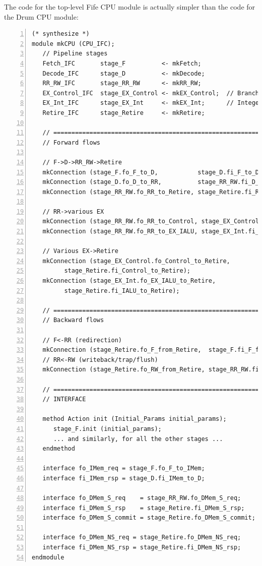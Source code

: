 \label{Sec_Fife_CPU_module}

The code for the top-level Fife CPU module is actually simpler than
the code for the Drum CPU module:

{\small
\begin{Verbatim}[frame=single, numbers=left, label=(In file:src\_Fife/CPU.bsv)]
(* synthesize *)
module mkCPU (CPU_IFC);
   // Pipeline stages
   Fetch_IFC       stage_F          <- mkFetch;
   Decode_IFC      stage_D          <- mkDecode;
   RR_RW_IFC       stage_RR_RW      <- mkRR_RW;
   EX_Control_IFC  stage_EX_Control <- mkEX_Control;  // Branch, JAL, JALR
   EX_Int_IFC      stage_EX_Int     <- mkEX_Int;      // Integer ops
   Retire_IFC      stage_Retire     <- mkRetire;

   // ================================================================
   // Forward flows

   // F->D->RR_RW->Retire
   mkConnection (stage_F.fo_F_to_D,           stage_D.fi_F_to_D);
   mkConnection (stage_D.fo_D_to_RR,          stage_RR_RW.fi_D_to_RR);
   mkConnection (stage_RR_RW.fo_RR_to_Retire, stage_Retire.fi_RR_to_Retire);

   // RR->various EX
   mkConnection (stage_RR_RW.fo_RR_to_Control, stage_EX_Control.fi_RR_to_Control);
   mkConnection (stage_RR_RW.fo_RR_to_EX_IALU, stage_EX_Int.fi_RR_to_EX_IALU);

   // Various EX->Retire
   mkConnection (stage_EX_Control.fo_Control_to_Retire,
		 stage_Retire.fi_Control_to_Retire);
   mkConnection (stage_EX_Int.fo_EX_IALU_to_Retire,
		 stage_Retire.fi_IALU_to_Retire);

   // ================================================================
   // Backward flows

   // F<-RR (redirection)
   mkConnection (stage_Retire.fo_F_from_Retire,  stage_F.fi_F_from_Retire);
   // RR<-RW (writeback/trap/flush)
   mkConnection (stage_Retire.fo_RW_from_Retire, stage_RR_RW.fi_RW_from_Retire);

   // ================================================================
   // INTERFACE

   method Action init (Initial_Params initial_params);
      stage_F.init (initial_params);
      ... and similarly, for all the other stages ...
   endmethod

   interface fo_IMem_req = stage_F.fo_F_to_IMem;
   interface fi_IMem_rsp = stage_D.fi_IMem_to_D;

   interface fo_DMem_S_req    = stage_RR_RW.fo_DMem_S_req;
   interface fi_DMem_S_rsp    = stage_Retire.fi_DMem_S_rsp;
   interface fo_DMem_S_commit = stage_Retire.fo_DMem_S_commit;

   interface fo_DMem_NS_req = stage_Retire.fo_DMem_NS_req;
   interface fi_DMem_NS_rsp = stage_Retire.fi_DMem_NS_rsp;
endmodule
\end{Verbatim}
}

